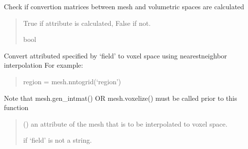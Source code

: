 \documentclass[letterpaper,10pt,english]{sphinxmanual}
\begin{document}
\begin{fulllineitems}

\begin{fulllineitems}
\label{\detokenize{_autosummary/nirfasterff.base.mesh.mesh:nirfasterff.base.mesh.mesh.isvol}}
\pysigstartsignatures
\pysiglinewithargsret
{}
{}
{}
\pysigstopsignatures
\sphinxAtStartPar
Check if convertion matrices between mesh and volumetric spaces are calculated
\begin{quote}\begin{description}
\sphinxAtStartPar
True if attribute  is calculated, False if not.

\sphinxAtStartPar
bool

\end{description}\end{quote}

\end{fulllineitems}


\begin{fulllineitems}
\label{\detokenize{_autosummary/nirfasterff.base.mesh.mesh:nirfasterff.base.mesh.mesh.nntogrid}}
\pysigstartsignatures
\pysiglinewithargsret
{}
{}
{}
\pysigstopsignatures
\sphinxAtStartPar
Convert attributed specified by ‘field’ to voxel space using nearest\sphinxhyphen{}neighbor interpolation
For example:
\begin{quote}

\sphinxAtStartPar
region = mesh.nntogrid(‘region’)
\end{quote}

\sphinxAtStartPar
Note that mesh.gen\_intmat() OR mesh.voxelize() must be called prior to this function
\begin{quote}\begin{description}
\sphinxAtStartPar
{} () \textendash{} an attribute of the mesh that is to be interpolated to voxel space.

\sphinxAtStartPar
{} \textendash{} if ‘field’ is not a string.


\end{description}
\end{quote}
\end{fulllineitems}
\end{fulllineitems}
\end{document}
